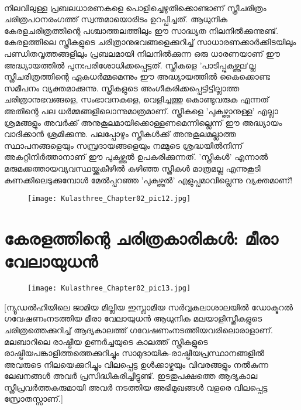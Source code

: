 \paragraph{}നിലവിലുള്ള പ്രബലധാരണകളെ പൊളിച്ചെഴുതിക്കൊണ്ടാണ് സ്ത്രീചരിത്രം ചരിത്രപഠനരംഗത്ത് സ്വന്തമായൊരിടം ഉറപ്പിച്ചത്. ആധുനിക കേരളചരിത്രത്തിന്റെ പശ്ചാത്തലത്തിലും ഈ സാദ്ധ്യത നിലനിൽക്കുന്നുണ്ട്. കേരളത്തിലെ സ്ത്രീകളുടെ ചരിത്രാനുഭവങ്ങളെക്കുറിച്ച് സാധാരണക്കാർക്കിടയിലും പണ്ഡിതവൃത്തങ്ങളിലും പ്രബലമായി നിലനിൽക്കുന്ന ഒരു ധാരണയാണ് ഈ അദ്ധ്യായത്തിൽ പുനഃപരിശോധിക്കപ്പെട്ടത്. സ്ത്രീകളെ 'പാടിപ്പുകഴ്ത്തല'ല്ല സ്ത്രീചരിത്രത്തിന്റെ ഏകധർമ്മമെന്നും ഈ അദ്ധ്യായത്തിൽ കൈക്കൊണ്ട സമീപനം വ്യക്തമാക്കുന്നു. സ്ത്രീകളുടെ അംഗീകരിക്കപ്പെട്ടിട്ടില്ലാത്ത ചരിത്രാനുഭവങ്ങളെ, സംഭാവനകളെ, വെളിച്ചത്തു കൊണ്ടുവരുക എന്നത് അതിന്റെ പല ധർമ്മങ്ങളിലൊന്നുമാത്രമാണ്. സ്ത്രീകളെ 'പുകഴ്ത്താനുള്ള' എല്ലാ ശ്രമങ്ങളും അവർക്ക് അനുകൂലമായിക്കൊള്ളണമെന്നില്ലെന്ന് ഈ അദ്ധ്യായം വാദിക്കാൻ ശ്രമിക്കുന്നു. പലപ്പോഴും സ്ത്രീകൾക്ക് അനുകൂലമല്ലാത്ത സ്ഥാപനങ്ങളെയും സമ്പ്രദായങ്ങളെയും നമ്മുടെ ശ്രദ്ധയിൽനിന്ന് അകറ്റിനിർത്താനാണ് ഈ പുകഴ്ത്തൽ ഉപകരിക്കുന്നത്. 'സ്ത്രീകൾ' എന്നാൽ മരുമക്കത്തായവ്യവസ്ഥയ്ക്കുകീഴിൽ കഴിഞ്ഞ സ്ത്രീകൾ മാത്രമല്ല എന്നുകൂടി കണക്കിലെടുക്കുമ്പോൾ മേൽപ്പറഞ്ഞ 'പുകഴ്ത്തൽ' എളുപ്പമാവില്ലെന്നു വ്യക്തമാണ്! 
\begin{figure}[h]
\begin{center}
\texttt{[image: Kulasthree\_Chapter02\_pic12.jpg]}
\end{center}
\end{figure}

\section{കേരളത്തിന്റെ ചരിത്രകാരികൾ: മീരാ വേലായുധൻ}
\begin{figure}[h]
\begin{center}
\texttt{[image: Kulasthree\_Chapter02\_pic13.jpg]}
\end{center}
\end{figure}
[ന്യൂഡൽഹിയിലെ ജാമിയ മില്ലിയ ഇസ്ലാമിയ സർവ്വകലാശാലയിൽ ഡോക്ടറൽ ഗവേഷണംനടത്തിയ മീരാ വേലായുധൻ ആധുനിക മലയാളിസ്ത്രീകളുടെ ചരിത്രത്തെക്കുറിച്ച് ആദ്യകാലത്ത് ഗവേഷണംനടത്തിയവരിലൊരാളാണ്. മലബാറിലെ രാഷ്ട്രീയ ഉണർച്ചയുടെ കാലത്ത് സ്ത്രീകളുടെ രാഷ്ട്രീയപങ്കാളിത്തത്തെക്കുറിച്ചും സാമുദായിക-രാഷ്ട്രീയപ്രസ്ഥാനങ്ങളിൽ അവരുടെ നിലയെക്കുറിച്ചും വിലപ്പെട്ട ഉൾക്കാഴ്ചയും വിവരങ്ങളും നൽകുന്ന ലേഖനങ്ങൾ അവർ പ്രസിദ്ധീകരിച്ചിട്ടുണ്ട്. ഇടതുപക്ഷത്തെ ആദ്യകാല സ്ത്രീപ്രവർത്തകരുമായി അവർ നടത്തിയ അഭിമുഖങ്ങൾ വളരെ വിലപ്പെട്ട സ്രോതസ്സാണ്.]

